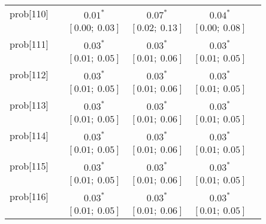 \begin{table}
\begin{center}
\begin{tabular}{l c c c c c }
prob[110]   &                                  & $0.01^{*}$                & $0.07^{*}$                & $0.04^{*}$              &                         \\
            &                                  & $[0.00;\ 0.03]$           & $[0.02;\ 0.13]$           & $[0.00;\ 0.08]$         &                         \\
prob[111]   &                                  & $0.03^{*}$                & $0.03^{*}$                & $0.03^{*}$              &                         \\
            &                                  & $[0.01;\ 0.05]$           & $[0.01;\ 0.06]$           & $[0.01;\ 0.05]$         &                         \\
prob[112]   &                                  & $0.03^{*}$                & $0.03^{*}$                & $0.03^{*}$              &                         \\
            &                                  & $[0.01;\ 0.05]$           & $[0.01;\ 0.06]$           & $[0.01;\ 0.05]$         &                         \\
prob[113]   &                                  & $0.03^{*}$                & $0.03^{*}$                & $0.03^{*}$              &                         \\
            &                                  & $[0.01;\ 0.05]$           & $[0.01;\ 0.06]$           & $[0.01;\ 0.05]$         &                         \\
prob[114]   &                                  & $0.03^{*}$                & $0.03^{*}$                & $0.03^{*}$              &                         \\
            &                                  & $[0.01;\ 0.05]$           & $[0.01;\ 0.06]$           & $[0.01;\ 0.05]$         &                         \\
prob[115]   &                                  & $0.03^{*}$                & $0.03^{*}$                & $0.03^{*}$              &                         \\
            &                                  & $[0.01;\ 0.05]$           & $[0.01;\ 0.06]$           & $[0.01;\ 0.05]$         &                         \\
prob[116]   &                                  & $0.03^{*}$                & $0.03^{*}$                & $0.03^{*}$              &                         \\
            &                                  & $[0.01;\ 0.05]$           & $[0.01;\ 0.06]$           & $[0.01;\ 0.05]$         &                         \\

\end{tabular}
\end{center}
\end{table}
